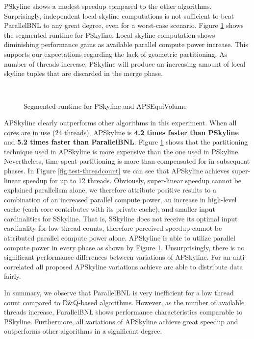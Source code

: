 \documentclass[12pt,a4paper,twoside]{report}
\begin{document}
PSkyline shows a modest speedup compared to the other algorithms.
Surprisingly, independent local skyline computations is not
sufficient to beat ParallelBNL to any great degree, even for a
worst-case scenario. Figure \ref{fig:test-threadcount-segmented}
shows the segmented runtime for PSkyline. Local skyline
computation shows diminishing performance gains as available
parallel compute power increase. This supports our expectations
regarding the lack of geometric partitioning. As number of threads
increase, PSkyline will produce an increasing amount of local
skyline tuples that are discarded in the merge phase.

\begin{figure}[H]
	\centering
		\\
	\caption{Segmented runtime for PSkyline and APSEquiVolume}
	\label{fig:test-threadcount-segmented}
\end{figure}

APSkyline clearly outperforms other algorithms in this experiment. When
all cores are in use (24 threads), APSkyline is \textbf{4.2 times
faster than PSkyline} and \textbf{5.2 times faster than
ParallelBNL}. Figure \ref{fig:test-threadcount-segmented} shows
that the partitioning technique used in APSkyline is more
expensive than the one used in PSkyline. Nevertheless, time spent
partitioning is more than compensated for in subsequent phases.
In Figure \ref{fig:test-threadcount} we can see that APSkyline
achieves super-linear speedup for up to 12 threads. Obviously,
super-linear speedup cannot be explained parallelism alone, we
therefore attribute positive results to a combination of an
increased parallel compute power, an increase in high-level cache
(each core contributes with its private cache), and smaller input
cardinalities for SSkyline. That is, SSkyline does not receive its
optimal input cardinality for low thread counts, therefore
perceived speedup cannot be attributed parallel compute power
alone. APSkyline is able to utilize parallel compute power in
every phase as shown by Figure
\ref{fig:test-threadcount-segmented}. Unsurprisingly, there is no
significant performance differences between variations of
APSkyline. For an anti-correlated all proposed APSkyline
variations achieve are able to distribute data fairly.

In summary, we observe that ParallelBNL is very inefficient for a low
thread count compared to D\&Q-based algorithms. However, as the number
of available threads increase, ParallelBNL shows performance
characteristics comparable to PSkyline. Furthermore, all variations of
APSkyline achieve great speedup and outperforms other algorithms in a
significant degree.
\end{document}
